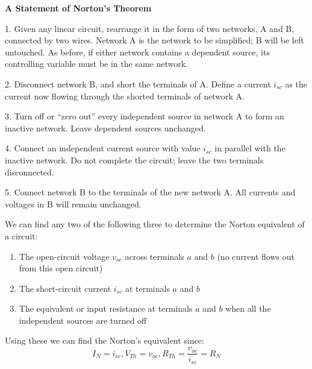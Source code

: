 \documentclass[12pt]{article}
\begin{document}
\newpage
\textbf{A Statement of Norton’s Theorem}
\begin{trivlist}
\item1. Given any linear circuit, rearrange it in the form of two networks, A and B, connected by two wires. Network A is the network to be simplified; B will be left untouched. As before, if either network contains a dependent source, its controlling variable must be in the same network.
\item2. Disconnect network B, and short the terminals of A. Define a current $i_{sc}$ as the current now flowing through the shorted terminals of network A.
\item3. Turn off or “zero out” every independent source in network A to form an inactive network. Leave dependent sources unchanged.
\item4. Connect an independent current source with value $i_{sc}$ in parallel with the inactive network. Do not complete the circuit; leave the two terminals disconnected.
\item5. Connect network B to the terminals of the new network A. All currents and voltages in B will remain unchanged.
\end{trivlist}
\vskip 0.1in
We can find any two of the following three to determine the Norton equivalent of a circuit:
\begin{enumerate}
    \item The open-circuit voltage $v_{oc}$ across terminals $a$ and $b$ (no current flows out from this open circuit)
    \item The short-circuit current $i_{sc}$ at terminals $a$ and $b$
    \item The equivalent or input resistance at terminals $a$ and $b$ when all the independent sources are turned off
\end{enumerate}
Using these we can find the Norton's equivalent since: 
$$I_{N} = i_{sc}, V_{Th} = v_{oc}, R_{Th} = \frac{v_{oc}}{i_{sc}} = R_{N}$$
\end{document}
